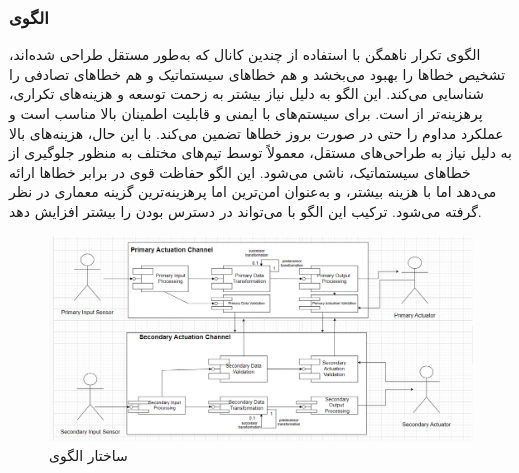 \subsubsection{الگوی }
\label{archSafeHeteroRedundancySec}
\begin{RTL}
الگوی تکرار ناهمگن \cite{ref4}
با استفاده از چندین کانال که به‌طور مستقل طراحی شده‌اند،
تشخیص خطاها را بهبود می‌بخشد و هم خطاهای سیستماتیک و
هم خطاهای تصادفی را شناسایی می‌کند. این الگو به دلیل نیاز بیشتر به زحمت
توسعه و هزینه‌های تکراری، پرهزینه‌تر از
 است. برای
سیستم‌های با ایمنی و قابلیت اطمینان بالا مناسب است
و عملکرد مداوم را حتی در صورت بروز خطاها تضمین می‌کند. با این حال،
هزینه‌های بالا به دلیل نیاز به طراحی‌های مستقل، معمولاً توسط تیم‌های مختلف
به منظور جلوگیری از خطاهای سیستماتیک، ناشی می‌شود. این الگو حفاظت
قوی در برابر خطاها ارائه می‌دهد اما با هزینه بیشتر، و به‌عنوان امن‌ترین اما
پرهزینه‌ترین گزینه معماری در نظر گرفته می‌شود.
ترکیب این الگو با  می‌تواند
در دسترس بودن را بیشتر افزایش دهد.
\end{RTL}
\begin{figure}[h!]
\centering
\includegraphics[scale=0.5]{images/second/hetero.png}
\caption{ساختار الگوی }
\end{figure}